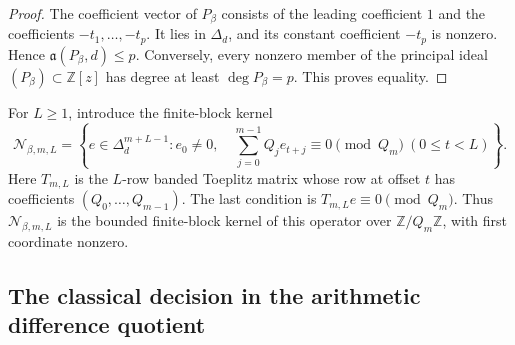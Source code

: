 \begin{proof}
The coefficient vector of $P_\beta$ consists of the leading coefficient
$1$ and the coefficients $-t_1,\ldots,-t_p$.  It lies in $\Delta_d$, and its
constant coefficient $-t_p$ is nonzero.  Hence
$\mathfrak a(P_\beta,d)\le p$.  Conversely, every nonzero member of the
principal ideal $(P_\beta)\subset\mathbb Z[z]$ has degree at least
$\deg P_\beta=p$.  This proves equality.
\end{proof}

For $L\ge1$, introduce the finite-block kernel
\begin{equation}
\mathcal N_{\beta,m,L}
=\left\{e\in\Delta_d^{m+L-1}:
e_0\ne0,\quad
\sum_{j=0}^{m-1}Q_je_{t+j}\equiv0\pmod{Q_m}
\ (0\le t<L)\right\}.
\label{eq:bad-sliding-congruence-set}
\end{equation}
Here $T_{m,L}$ is the $L$-row banded Toeplitz matrix whose row at offset $t$
has coefficients $(Q_0,\ldots,Q_{m-1})$.  The last condition is
$T_{m,L}e\equiv0\pmod{Q_m}$.  Thus $\mathcal N_{\beta,m,L}$ is the bounded
finite-block kernel of this operator over $\mathbb Z/Q_m\mathbb Z$, with
first coordinate nonzero.

\subsection{The classical decision in the arithmetic difference quotient}

